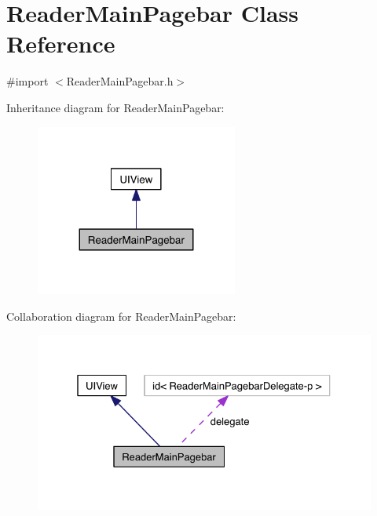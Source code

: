 \hypertarget{interface_reader_main_pagebar}{\section{Reader\-Main\-Pagebar Class Reference}
\label{dc/d4a/interface_reader_main_pagebar}
}


{\ttfamily \#import $<$Reader\-Main\-Pagebar.\-h$>$}



Inheritance diagram for Reader\-Main\-Pagebar\-:
\nopagebreak
\begin{figure}[H]
\begin{center}
\leavevmode
\includegraphics[width=188pt]{dd/df8/interface_reader_main_pagebar__inherit__graph}
\end{center}
\end{figure}


Collaboration diagram for Reader\-Main\-Pagebar\-:
\nopagebreak
\begin{figure}[H]
\begin{center}
\leavevmode
\includegraphics[width=327pt]{d9/df0/interface_reader_main_pagebar__coll__graph}
\end{center}
\end{figure}
